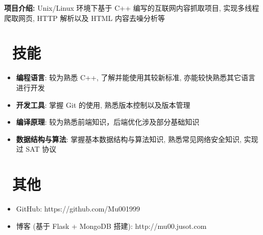 \documentclass{resume}
\begin{document}
\begin{onehalfspacing}
\textbf{项目介绍: } Unix/Linux 环境下基于 C++ 编写的互联网内容抓取项目, 实现多线程爬取网页, HTTP 解析以及 HTML 内容去噪分析等
\end{onehalfspacing}


\section{\faCogs\ 技能}
\begin{itemize}[parsep=0.5ex]
  \item \textbf{编程语言}: 较为熟悉 C++, 了解并能使用其较新标准, 亦能较快熟悉其它语言进行开发
  \item \textbf{开发工具}: 掌握 Git 的使用, 熟悉版本控制以及版本管理
  \item \textbf{编译原理}: 较为熟悉前端知识，后端优化涉及部分基础知识
  \item \textbf{数据结构与算法}: 掌握基本数据结构与算法知识, 熟悉常见网络安全知识, 实现过 SAT 协议
\end{itemize}

\section{\faInfo\ 其他}
\begin{itemize}[parsep=0.5ex]
  \item GitHub: https://github.com/Mu001999
  \item 博客 (基于 Flask + MongoDB 搭建): http://mu00.jusot.com
\end{itemize}

%
%
\end{document}
